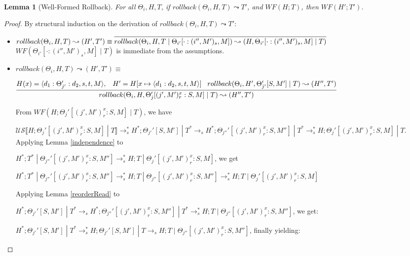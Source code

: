 \documentclass[9pt]{article}
\newtheorem{lemma}{Lemma}
\newcommand\specStep{\rightarrow_{s}}
\newcommand{\unSpec}[1]{\mathcal{US} \llbracket #1 \rrbracket}
\begin{document}
\begin{lemma}[Well-Formed Rollback]
\label{wellFormedRollback}
For all $\Theta_i, H, T$, if $rollback(\Theta_i, H, T) \leadsto T'$, and $WF(H; T)$, then $WF(H'; T')$. 
\end{lemma}

\begin{proof}
By structural induction on the derivation of $rollback(\Theta_i, H, T) \leadsto T'$:

\begin{itemize}
\item $rollback(\Theta_i, H, T) \leadsto (H',T') \equiv \infer[]{rollback(\Theta_i, H, T \; | \; \Theta_{i'}[\cdot : (i'', M')_s, M]) \leadsto (H, \Theta_{i'}[\cdot : (i'', M')_s, M] \; | \; T)}{}$
$WF(\Theta_{i'}[\cdot : (i'', M')_s, M] \; | \; T)$ is immediate from the assumptions. 

\item $rollback(\Theta_i, H, T ) \leadsto (H', T') \equiv$

$ \infer[]{rollback(\Theta_i, H, \Theta_j'[(j', M')_r^x : S, M] \; | \; T) \leadsto (H'', T')}{H(x) = \langle d_1 : \Theta_{j'}' : d_2, s, t, M\rangle, \;\;\; H' = H[x \mapsto \langle d_1 : d_2, s, t, M\rangle] \;\;\; rollback(\Theta_i, H', \Theta_{j'}'[S, M'] \; | \; T) \leadsto (H'', T')}$

From $WF(H; \Theta_j'[(j', M')_r^x : S, M] \; | \; T)$, we have 

$\unSpec{H; \Theta_j'[ (j', M')_r^x : S, M] \; | \; T} \specStep^* H^*; \Theta_{j'}'[S, M'] \; | \; T^* \specStep H^*; \Theta_{j''}'[ (j', M')_r^x : S, M''] \; | \; T^* \specStep^* H; \Theta_j'[(j', M')_r^x : S, M] \; | \; T$.  Applying Lemma \ref{independence} to 

$H^*; T^* \; | \; \Theta_{j''}'[(j', M')_r^x : S, M'']  \specStep^* H; T \; | \; \Theta_j'[(j', M')_r^x : S, M] $, we get

$H^*; T^* \; | \; \Theta_{j''}'[(j', M')_r^x : S, M'']  \specStep^* H; T \; | \; \Theta_{j''}[ (j', M')_r^x : S, M''] \specStep^* H; T \; | \; \Theta_j'[ (j', M')_r^x : S, M] $

Applying Lemma \ref{reorderRead} to 

$H^*; \Theta_{j'}'[S, M'] \; | \; T^* \specStep H^*; \Theta_{j''}'[(j', M')_r^x : S, M''] \; | \; T^* \specStep^*  H; T \; | \; \Theta_{j''}[ (j', M')_r^x : S, M'']$, we get:

$H^*; \Theta_{j'}'[S, M'] \; | \; T^* \specStep^* H; \Theta_{j'}'[S, M'] \; | \; T \specStep  H; T \; | \; \Theta_{j''}[(j', M')_r^x : S, M'']$, finally yielding:


\end{itemize}
\end{proof}
\end{document}
